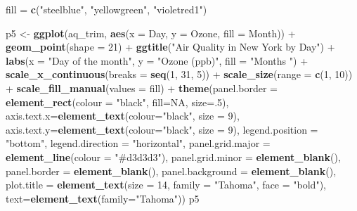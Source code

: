 \documentclass[]{article}
\newenvironment{Shaded}{\begin{snugshade}}{\end{snugshade}}
\newcommand{\KeywordTok}[1]{\textcolor[rgb]{0.13,0.29,0.53}{\textbf{{#1}}}}
\newcommand{\DataTypeTok}[1]{\textcolor[rgb]{0.13,0.29,0.53}{{#1}}}
\newcommand{\DecValTok}[1]{\textcolor[rgb]{0.00,0.00,0.81}{{#1}}}
\newcommand{\StringTok}[1]{\textcolor[rgb]{0.31,0.60,0.02}{{#1}}}
\newcommand{\OtherTok}[1]{\textcolor[rgb]{0.56,0.35,0.01}{{#1}}}
\newcommand{\NormalTok}[1]{{#1}}
\begin{document}
\begin{Shaded}
\begin{Highlighting}[]
\NormalTok{fill =}\StringTok{ }\KeywordTok{c}\NormalTok{(}\StringTok{"steelblue"}\NormalTok{, }\StringTok{"yellowgreen"}\NormalTok{, }\StringTok{"violetred1"}\NormalTok{)}

\NormalTok{p5 <-}\StringTok{ }\KeywordTok{ggplot}\NormalTok{(aq_trim, }\KeywordTok{aes}\NormalTok{(}\DataTypeTok{x =} \NormalTok{Day, }\DataTypeTok{y =} \NormalTok{Ozone, }\DataTypeTok{fill =} \NormalTok{Month)) +}
\StringTok{  }\KeywordTok{geom_point}\NormalTok{(}\DataTypeTok{shape =} \DecValTok{21}\NormalTok{) +}
\StringTok{  }\KeywordTok{ggtitle}\NormalTok{(}\StringTok{"Air Quality in New York by Day"}\NormalTok{) +}\StringTok{ }
\StringTok{  }\KeywordTok{labs}\NormalTok{(}\DataTypeTok{x =} \StringTok{"Day of the month"}\NormalTok{, }\DataTypeTok{y =} \StringTok{"Ozone (ppb)"}\NormalTok{, }\DataTypeTok{fill =} \StringTok{"Months "}\NormalTok{) +}
\StringTok{  }\KeywordTok{scale_x_continuous}\NormalTok{(}\DataTypeTok{breaks =} \KeywordTok{seq}\NormalTok{(}\DecValTok{1}\NormalTok{, }\DecValTok{31}\NormalTok{, }\DecValTok{5}\NormalTok{)) +}
\StringTok{  }\KeywordTok{scale_size}\NormalTok{(}\DataTypeTok{range =} \KeywordTok{c}\NormalTok{(}\DecValTok{1}\NormalTok{, }\DecValTok{10}\NormalTok{)) +}
\StringTok{  }\KeywordTok{scale_fill_manual}\NormalTok{(}\DataTypeTok{values =} \NormalTok{fill) +}
\StringTok{  }\KeywordTok{theme}\NormalTok{(}\DataTypeTok{panel.border =} \KeywordTok{element_rect}\NormalTok{(}\DataTypeTok{colour =} \StringTok{"black"}\NormalTok{, }\DataTypeTok{fill=}\OtherTok{NA}\NormalTok{, }\DataTypeTok{size=}\NormalTok{.}\DecValTok{5}\NormalTok{), }
    \DataTypeTok{axis.text.x=}\KeywordTok{element_text}\NormalTok{(}\DataTypeTok{colour=}\StringTok{"black"}\NormalTok{, }\DataTypeTok{size =} \DecValTok{9}\NormalTok{), }
    \DataTypeTok{axis.text.y=}\KeywordTok{element_text}\NormalTok{(}\DataTypeTok{colour=}\StringTok{"black"}\NormalTok{, }\DataTypeTok{size =} \DecValTok{9}\NormalTok{),  }
    \DataTypeTok{legend.position =} \StringTok{"bottom"}\NormalTok{, }\DataTypeTok{legend.direction =} \StringTok{"horizontal"}\NormalTok{,}
    \DataTypeTok{panel.grid.major =} \KeywordTok{element_line}\NormalTok{(}\DataTypeTok{colour =} \StringTok{"#d3d3d3"}\NormalTok{), }
    \DataTypeTok{panel.grid.minor =} \KeywordTok{element_blank}\NormalTok{(), }
    \DataTypeTok{panel.border =} \KeywordTok{element_blank}\NormalTok{(), }\DataTypeTok{panel.background =} \KeywordTok{element_blank}\NormalTok{(),}
    \DataTypeTok{plot.title =} \KeywordTok{element_text}\NormalTok{(}\DataTypeTok{size =} \DecValTok{14}\NormalTok{, }\DataTypeTok{family =} \StringTok{"Tahoma"}\NormalTok{, }\DataTypeTok{face =} \StringTok{"bold"}\NormalTok{),}
    \DataTypeTok{text=}\KeywordTok{element_text}\NormalTok{(}\DataTypeTok{family=}\StringTok{"Tahoma"}\NormalTok{)) }
\NormalTok{p5}
\end{Highlighting}
\end{Shaded}
\end{document}
